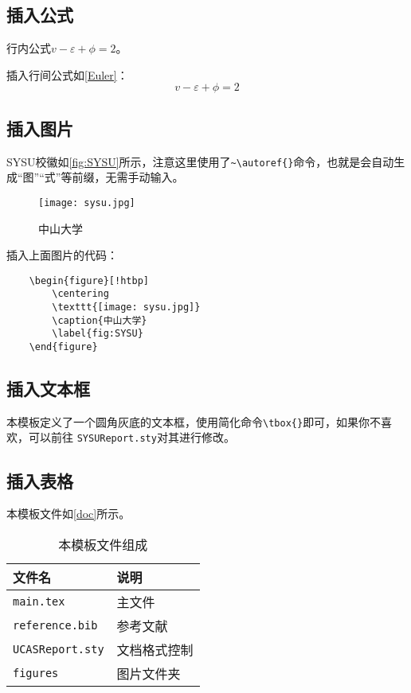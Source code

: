 \documentclass{SYSUReport}
\begin{document}
\subsection{插入公式}
行内公式$v-\varepsilon+\phi=2$。

插入行间公式如\autoref{Euler}：
\begin{equation}
    v-\varepsilon+\phi=2
    \label{Euler}
\end{equation}

\subsection{插入图片}
SYSU校徽如\autoref{fig:SYSU}所示，注意这里使用了\verb|~\autoref{}|命令，也就是会自动生成“图”“式”等前缀，无需手动输入。

\begin{figure}[!htbp]
    \centering
    \texttt{[image: sysu.jpg]}
    \caption{中山大学}
    \label{fig:SYSU}
\end{figure}

插入上面图片的代码：

\begin{verbatim}
    \begin{figure}[!htbp]
        \centering
        \texttt{[image: sysu.jpg]}
        \caption{中山大学}
        \label{fig:SYSU}
    \end{figure}
\end{verbatim}

\subsection{插入文本框}
本模板定义了一个圆角灰底的文本框，使用简化命令\verb|\tbox{}|即可，如果你不喜欢，可以前往 \texttt{SYSUReport.sty}对其进行修改。


\subsection{插入表格}
本模板文件如\autoref{doc}所示。
\begin{table}[!htbp]
    \centering
    \begin{tabular}{l  | l}
        \hline
        文件名                  & 说明         \\
        \hline
        \texttt{main.tex}       & 主文件       \\
        \texttt{reference.bib}  & 参考文献     \\
        \texttt{UCASReport.sty} & 文档格式控制 \\
        \texttt{figures}        & 图片文件夹   \\
        \hline
    \end{tabular}
    \caption{本模板文件组成}
    \label{doc}
\end{table}
\end{document}
